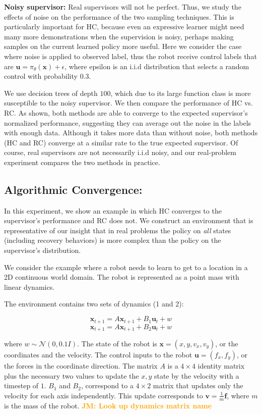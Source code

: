 \documentclass[10pt, conference]{ieeeconf}      %
\newcommand{\bu}{\mathbf{u}}
\newcommand{\bx}{\mathbf{x}}
\newcommand{\jmnote}[1]{\ifthenelse{ \boolean{include-notes}}%
 {\textcolor{orange}{\textbf{JM: #1}}}{}}
\begin{document}
\noindent \textbf{Noisy supervisor:}
Real supervisors will not be perfect. Thus, we study the effects of noise on the performance of the two sampling techniques. This is particularly important for HC, because even an expressive learner might need many more demonstrations when the supervision is noisy, perhaps making samples on the current learned policy more useful. Here we consider the case where noise is applied to observed label, thus the robot receive control labels that are $\bu = \pi_{\theta}(\bx) + \epsilon$,  where epsilon is an i.i.d distribution that selects a random control with probability $0.3$.

We use decision trees of depth $100$, which due to its large function class is more susceptible to the noisy supervisor. We then compare the performance of HC vs. RC. As shown, both methods are able to converge to the expected supervisor's normalized performance, suggesting they can average out the noise in the labels with enough data. Although it takes more data than without noise, both methods (HC and RC) converge at a similar rate to the true expected supervisor. Of course, real supervisors are not necessarily i.i.d noisy, and our real-problem experiment compares the two methods in practice.

\subsection{Algorithmic Convergence:}
In this experiment, we show an example in which HC converges to the supervisor's performance and RC does not. We construct an environment that is representative of our insight that in real problems the policy on \emph{all} states (including recovery behaviors) is more complex than the policy on the supervisor's distribution.

We consider the example where a robot needs to learn to get to a location in a 2D continuous world domain. The robot is represented as a point mass with linear dynamics. 

The environment contains two sets of dynamics (1 and 2): 

$$\bx_{t+1} = A\bx_{t+1}+B_1\bu_t+w$$
$$\bx_{t+1} = A\bx_{t+1}+B_2\bu_t + w$$

where $w\sim \mathcal{N}(0,0.1 I)$. The state of the robot is $\bx = (x,y,v_x,v_y)$, or the coordinates and the velocity. The control inputs to the robot $\bu = (f_x,f_y)$, or the forces in the coordinate direction. The matrix $A$ is a $4\times4$ identity matrix plus the necessary two values to update the $x,y$ state by the velocity with a timestep of $1$. $B_1$ and $B_2$, correspond to a $4\times 2$ matrix that updates only the velocity for each axis independently. This update corresponds to $\mathbf{v} = \frac{1}{m} \mathbf{f}$, where $m$ is the mass of the robot.
\jmnote{Look up dynamics matrix name}
\end{document}
